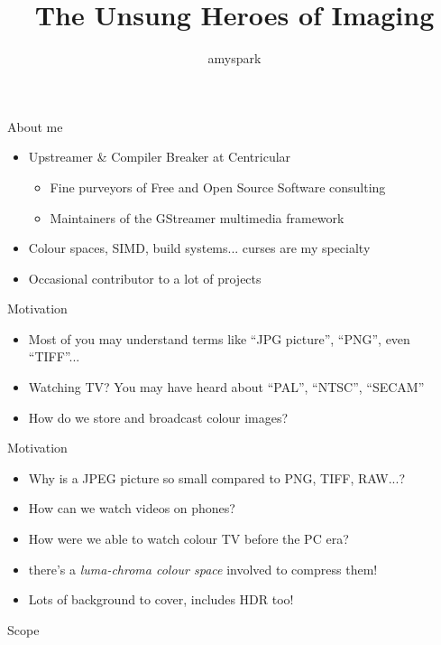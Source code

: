 \documentclass[aspectratio=169,handout,usepdftitle=false]{fireshonks}
\title{The Unsung Heroes of Imaging}
\author{amyspark}
\date{\DTMdate{2023-12-27}}
\begin{document}
\maketitle

\begin{frame}{About me}
    \begin{itemize}[<*>]
        \item Upstreamer \& Compiler Breaker at Centricular
              \begin{itemize}[<*>]
                  \item Fine purveyors of Free and Open Source Software consulting
                  \item Maintainers of the GStreamer multimedia framework
              \end{itemize}
        \item Colour spaces, SIMD, build systems... curses are my specialty 
        \item Occasional contributor to a lot of projects
    \end{itemize}
\end{frame}
\begin{frame}{Motivation}
    \begin{itemize}
        \item Most of you may understand terms like \enquote{JPG picture}, \enquote{PNG}, even \enquote{TIFF}...
        \item Watching TV? You may have heard about \enquote{PAL}, \enquote{NTSC}, \enquote{SECAM}
        \item How do we store and broadcast colour images?
    \end{itemize}
\end{frame}

\begin{frame}{Motivation}
    \begin{itemize}
        \item Why is a JPEG picture so small compared to PNG, TIFF, RAW...?
        \item How can we watch  videos on phones?
        \item How were we able to watch colour TV before the PC era?
        \item {} there's a \emph{luma-chroma colour space} involved to compress them!
        \item Lots of background to cover, includes HDR too!
    \end{itemize}
\end{frame}
\begin{frame}{Scope}
    \tableofcontents
\end{frame}
\end{document}
